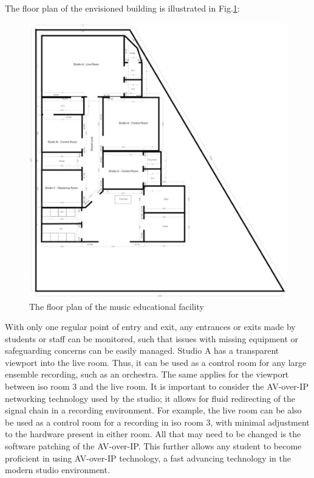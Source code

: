 \documentclass[10pt, twocolumn]{article}
\begin{document}
        The floor plan of the envisioned building is illustrated in Fig.\ref{floorplan}:
        \begin{figure}
            \centerline{\includegraphics[scale = 0.8]{resources/floorplan.png}}
            \caption{The floor plan of the music educational facility}
            \label{floorplan}
            \centering
        \end{figure}
        With only one regular point of entry and exit, any entrances or exits made by students or staff can be monitored, such that issues with missing equipment or safeguarding concerns can be easily managed.
        Studio A has a transparent viewport into the live room.
        Thus, it can be used as a control room for any large ensemble recording, such as an orchestra.
        The same applies for the viewport between iso room 3 and the live room.
        It is important to consider the AV-over-IP networking technology used by the studio; it allows for fluid redirecting of the signal chain in a recording environment.
        For example, the live room can be also be used as a control room for a recording in iso room 3, with minimal adjustment to the hardware present in either room.
        All that may need to be changed is the software patching of the AV-over-IP.
        This further allows any student to become proficient in using AV-over-IP technology, a fast advancing technology in the modern studio environment.
        
\end{document}
